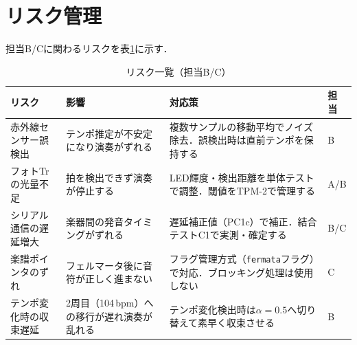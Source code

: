 \section{リスク管理}

担当B/Cに関わるリスクを表\ref{tab:risks}に示す．

\begin{table}[H]
  \centering
  \begin{tabularx}{\linewidth}{lXXl}
    \toprule
    リスク & 影響 & 対応策 & 担当 \\
    \midrule
    赤外線センサー誤検出 &
      テンポ推定が不安定になり演奏がずれる &
      複数サンプルの移動平均でノイズ除去．誤検出時は直前テンポを保持する & B \\
    フォトTrの光量不足 &
      拍を検出できず演奏が停止する &
      LED輝度・検出距離を単体テストで調整．閾値をTPM-2で管理する & A/B \\
    シリアル通信の遅延増大 &
      楽器間の発音タイミングがずれる &
      遅延補正値（PC1c）で補正．結合テストC1で実測・確定する & B/C \\
    楽譜ポインタのずれ &
      フェルマータ後に音符が正しく進まない &
      フラグ管理方式（\texttt{fermata}フラグ）で対応．ブロッキング処理は使用しない & C \\
    テンポ変化時の収束遅延 &
      2周目（104\,bpm）への移行が遅れ演奏が乱れる &
      テンポ変化検出時は$\alpha=0.5$へ切り替えて素早く収束させる & B \\
    \bottomrule
  \end{tabularx}
  \caption{リスク一覧（担当B/C）}
  \label{tab:risks}
\end{table}
